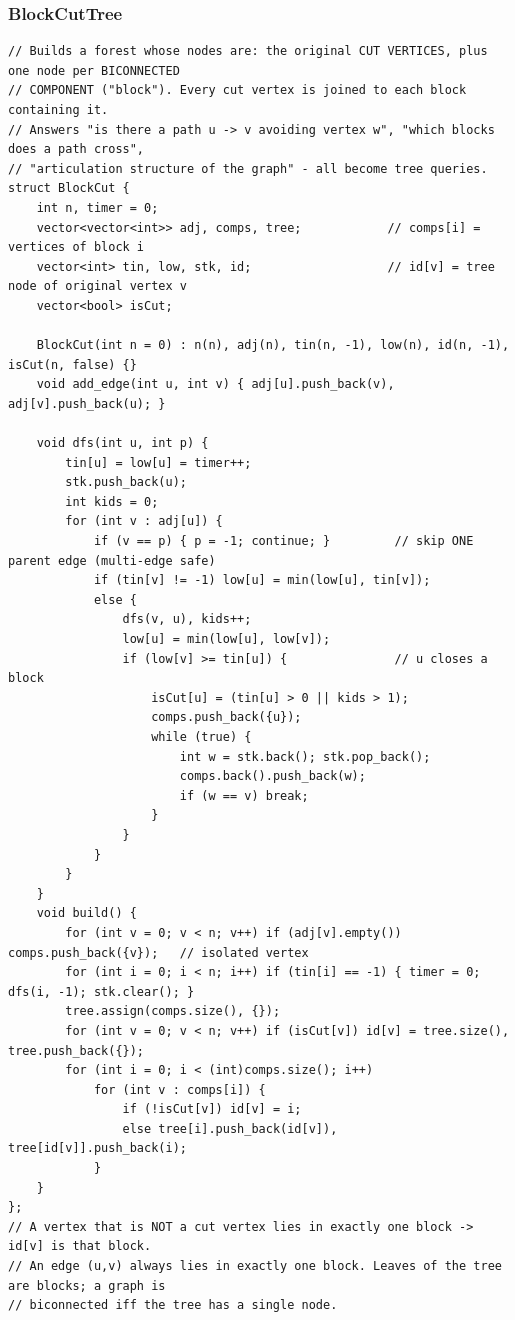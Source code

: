 \documentclass[9pt,a4paper,twocolumn]{extarticle}
\begin{document}
\subsubsection{BlockCutTree}
\nopagebreak
\begin{lstlisting}
// Builds a forest whose nodes are: the original CUT VERTICES, plus one node per BICONNECTED
// COMPONENT ("block"). Every cut vertex is joined to each block containing it.
// Answers "is there a path u -> v avoiding vertex w", "which blocks does a path cross",
// "articulation structure of the graph" - all become tree queries.
struct BlockCut {
    int n, timer = 0;
    vector<vector<int>> adj, comps, tree;            // comps[i] = vertices of block i
    vector<int> tin, low, stk, id;                   // id[v] = tree node of original vertex v
    vector<bool> isCut;

    BlockCut(int n = 0) : n(n), adj(n), tin(n, -1), low(n), id(n, -1), isCut(n, false) {}
    void add_edge(int u, int v) { adj[u].push_back(v), adj[v].push_back(u); }

    void dfs(int u, int p) {
        tin[u] = low[u] = timer++;
        stk.push_back(u);
        int kids = 0;
        for (int v : adj[u]) {
            if (v == p) { p = -1; continue; }         // skip ONE parent edge (multi-edge safe)
            if (tin[v] != -1) low[u] = min(low[u], tin[v]);
            else {
                dfs(v, u), kids++;
                low[u] = min(low[u], low[v]);
                if (low[v] >= tin[u]) {               // u closes a block
                    isCut[u] = (tin[u] > 0 || kids > 1);
                    comps.push_back({u});
                    while (true) {
                        int w = stk.back(); stk.pop_back();
                        comps.back().push_back(w);
                        if (w == v) break;
                    }
                }
            }
        }
    }
    void build() {
        for (int v = 0; v < n; v++) if (adj[v].empty()) comps.push_back({v});   // isolated vertex
        for (int i = 0; i < n; i++) if (tin[i] == -1) { timer = 0; dfs(i, -1); stk.clear(); }
        tree.assign(comps.size(), {});
        for (int v = 0; v < n; v++) if (isCut[v]) id[v] = tree.size(), tree.push_back({});
        for (int i = 0; i < (int)comps.size(); i++)
            for (int v : comps[i]) {
                if (!isCut[v]) id[v] = i;
                else tree[i].push_back(id[v]), tree[id[v]].push_back(i);
            }
    }
};
// A vertex that is NOT a cut vertex lies in exactly one block -> id[v] is that block.
// An edge (u,v) always lies in exactly one block. Leaves of the tree are blocks; a graph is
// biconnected iff the tree has a single node.
\end{lstlisting}
\end{document}
